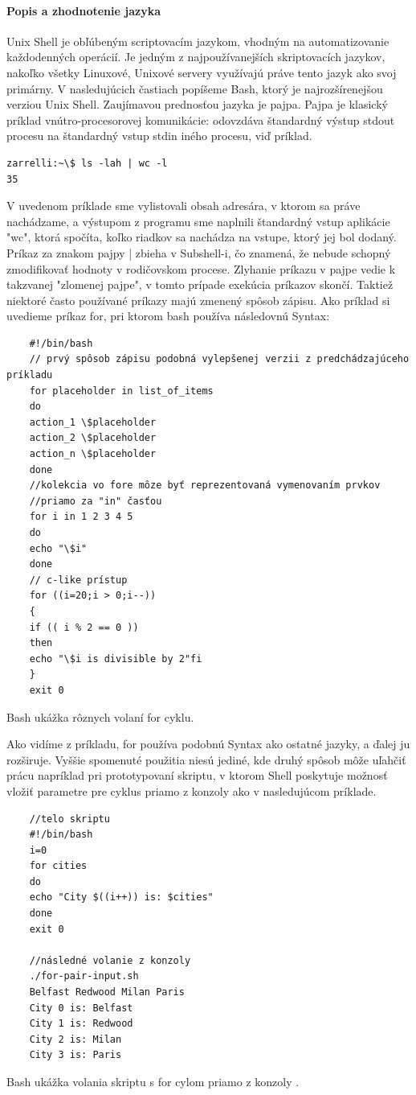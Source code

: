 \paragraph{Popis a zhodnotenie jazyka}
\indent
Unix Shell je obľúbeným scriptovacím jazykom, vhodným na automatizovanie každodenných operácií. Je jedným z najpoužívanejších skriptovacích jazykov, nakoľko všetky Linuxové, Unixové servery využívajú práve tento jazyk ako svoj primárny. V nasledujúcich častiach popíšeme Bash, ktorý je najrozšírenejšou verziou Unix Shell. Zaujímavou prednosťou jazyka je pajpa. Pajpa je klasický príklad vnútro-procesorovej komunikácie: odovzdáva štandardný výstup stdout procesu na štandardný vstup stdin iného procesu, viď príklad.
\begin{verbatim}
zarrelli:~\$ ls -lah | wc -l
35
\end{verbatim}
V uvedenom príklade sme vylistovali obsah adresára, v ktorom sa práve nachádzame, a výstupom z programu sme naplnili štandardný vstup aplikácie "wc", ktorá spočíta, koľko riadkov sa nachádza na vstupe, ktorý jej bol dodaný. Príkaz za znakom pajpy | zbieha v Subshell-i, čo znamená, že nebude schopný zmodifikovať hodnoty v rodičovskom procese. Zlyhanie príkazu v pajpe vedie k takzvanej "zlomenej pajpe", v tomto prípade exekúcia príkazov skončí. \cite{mbash}
\newpage
Taktiež niektoré často používané príkazy majú zmenený spôsob zápisu.
Ako príklad si uvedieme príkaz for, pri ktorom bash používa následovnú Syntax:

\begin{algorithm}[H]
	\begin{verbatim}
	#!/bin/bash
	// prvý spôsob zápisu podobná vylepšenej verzii z predchádzajúceho príkladu
	for placeholder in list_of_items
	do
	action_1 \$placeholder
	action_2 \$placeholder
	action_n \$placeholder
	done
	//kolekcia vo fore môze byť reprezentovaná vymenovaním prvkov 
	//priamo za "in" časťou
	for i in 1 2 3 4 5
	do
	echo "\$i"
	done
	// c-like prístup
	for ((i=20;i > 0;i--))
	{
	if (( i % 2 == 0 ))
	then
	echo "\$i is divisible by 2"fi
	}
	exit 0
	\end{verbatim} 
	\caption{Bash ukážka rôznych volaní for cyklu. \cite{mbash}}
	\label{alg:gen}
\end{algorithm}

Ako vidíme z príkladu, for používa podobnú Syntax ako ostatné jazyky, a ďalej ju rozširuje. Vyššie spomenuté použitia niesú jediné, kde druhý spôsob môže uľahčiť prácu napríklad pri prototypovaní skriptu, v ktorom Shell poskytuje možnosť vložiť parametre pre cyklus priamo z konzoly ako v nasledujúcom príklade.
\newpage
\begin{algorithm}[H]
	\begin{verbatim}
	//telo skriptu
	#!/bin/bash
	i=0
	for cities 
	do
	echo "City $((i++)) is: $cities"
	done
	exit 0
	
	//následné volanie z konzoly
	./for-pair-input.sh 
	Belfast Redwood Milan Paris
	City 0 is: Belfast
	City 1 is: Redwood
	City 2 is: Milan
	City 3 is: Paris
	\end{verbatim}
	\caption{Bash ukážka volania skriptu s for cylom priamo z konzoly . \cite{mbash}}
	\label{alg:gen}
\end{algorithm}

